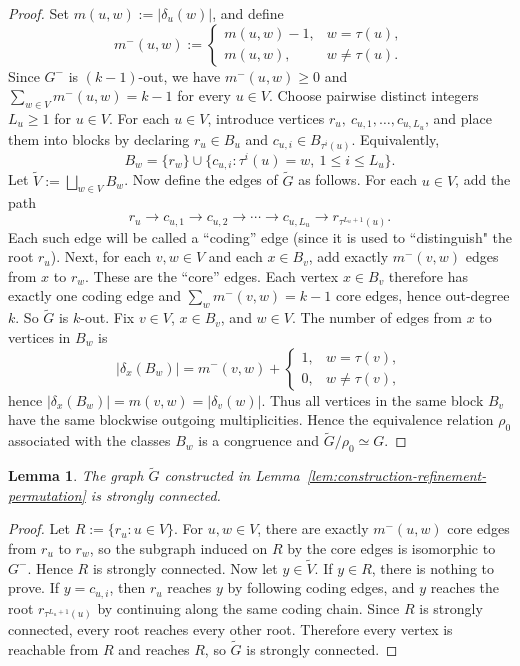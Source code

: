 \documentclass[a4paper,10pt]{amsart}
\theoremstyle{plain}
\newtheorem{lemma}[theorem]{Lemma}
\theoremstyle{definition}
\begin{document}
\begin{proof}
Set $m(u,w):=|\delta_u(w)|$, and define
\[
m^-(u,w):=
\begin{cases}
m(u,w)-1,& w=\tau(u),\\
m(u,w),& w\neq \tau(u).
\end{cases}
\]
Since $G^-$ is $(k-1)$-out, we have $m^-(u,w)\ge 0$ and $\sum_{w\in V} m^-(u,w)=k-1$ for every $u\in V$. Choose pairwise distinct integers $L_u\ge 1$ for $u\in V$. For each $u\in V$, introduce vertices $r_u,\ c_{u,1},\dots,c_{u,L_u}$, and place them into blocks by declaring $r_u\in B_u$ and $c_{u,i}\in B_{\tau^i(u)}$. Equivalently,
\[
B_w=\{r_w\}\cup\{c_{u,i}:\tau^i(u)=w,\ 1\le i\le L_u\}.
\]
Let $\widetilde V:=\bigsqcup_{w\in V} B_w$. Now define the edges of $\widetilde G$ as follows. For each $u\in V$, add the path
\[
r_u\to c_{u,1}\to c_{u,2}\to \cdots \to c_{u,L_u}\to r_{\tau^{L_u+1}(u)}.
\]
Each such edge will be called a ``coding'' edge (since it is used to ``distinguish" the root $r_u$). Next, for each $v,w\in V$ and each $x\in B_v$, add exactly $m^-(v,w)$ edges from $x$ to $r_w$. These are the ``core'' edges. Each vertex $x\in B_v$ therefore has exactly one coding edge and $\sum_w m^-(v,w)=k-1$ core edges, hence out-degree $k$. So $\widetilde G$ is $k$-out. Fix $v\in V$, $x\in B_v$, and $w\in V$. The number of edges from $x$ to vertices in $B_w$ is
\[
|\delta_x(B_w)|=m^-(v,w)+
\begin{cases}
1,& w=\tau(v),\\
0,& w\neq \tau(v),
\end{cases}
\]
hence $|\delta_x(B_w)|=m(v,w)=|\delta_v(w)|$. Thus all vertices in the same block $B_v$ have the same blockwise outgoing multiplicities. Hence the equivalence relation $\rho_0$ associated with the classes $B_w$ is a congruence and $\widetilde G/\rho_0\simeq G$.
\end{proof}
\begin{lemma}
\label{lem:strong-connectivity-refinement-permutation}
The graph $\widetilde G$ constructed in Lemma~\ref{lem:construction-refinement-permutation} is strongly connected.
\end{lemma}

\begin{proof}
Let $R:=\{r_u:u\in V\}$. For $u,w\in V$, there are exactly $m^-(u,w)$ core edges from $r_u$ to $r_w$, so the subgraph induced on $R$ by the core edges is isomorphic to $G^-$. Hence $R$ is strongly connected. Now let $y\in \widetilde V$. If $y\in R$, there is nothing to prove. If $y=c_{u,i}$, then $r_u$ reaches $y$ by following coding edges, and $y$ reaches the root $r_{\tau^{L_u+1}(u)}$ by continuing along the same coding chain. Since $R$ is strongly connected, every root reaches every other root. Therefore every vertex is reachable from $R$ and reaches $R$, so $\widetilde G$ is strongly connected.
\end{proof}
\end{document}
